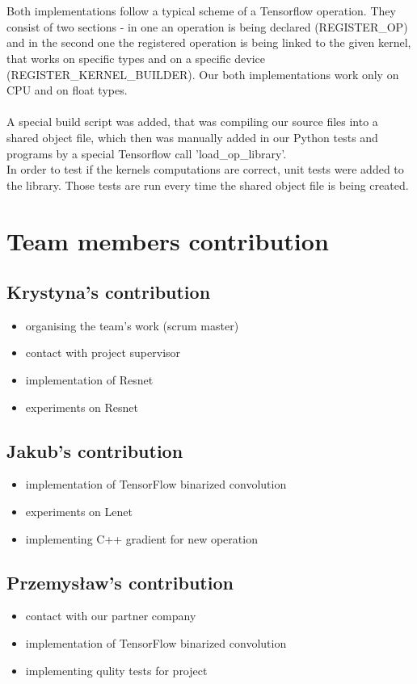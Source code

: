 \documentclass[licencjacka]{pracamgr}
\begin{document}
\\\\
		Both implementations follow a typical scheme of a Tensorflow operation. They consist of two sections - in one an operation is being declared (REGISTER\_OP) and in the second one the registered operation is being linked to the given kernel, that works on specific types and on a specific device (REGISTER\_KERNEL\_BUILDER). Our both implementations work only on CPU and on float types. 
\\\\
		A special build script was added, that was compiling our source files into a shared object file, which then was manually added in our Python tests and programs by a special Tensorflow call 'load\_op\_library'.
\\
		In order to test if the kernels computations are correct, unit tests were added to the library. Those tests are run every time the shared object file is being created.
	
	\chapter{Team members contribution}
	\section{Krystyna's contribution}
		\begin{itemize}
			\item organising the team's work (scrum master)
			\item contact with project supervisor
			\item implementation of Resnet
			\item experiments on Resnet
		\end{itemize}
	\section{Jakub's contribution}
		\begin{itemize}
			\item implementation of TensorFlow binarized convolution
			\item experiments on Lenet
			\item implementing C++ gradient for new operation
		\end{itemize}
	\section{Przemysław's contribution}
		\begin{itemize}
			\item contact with our partner company
			\item implementation of TensorFlow binarized convolution
			\item implementing qulity tests for project
		\end{itemize}
\end{document}
